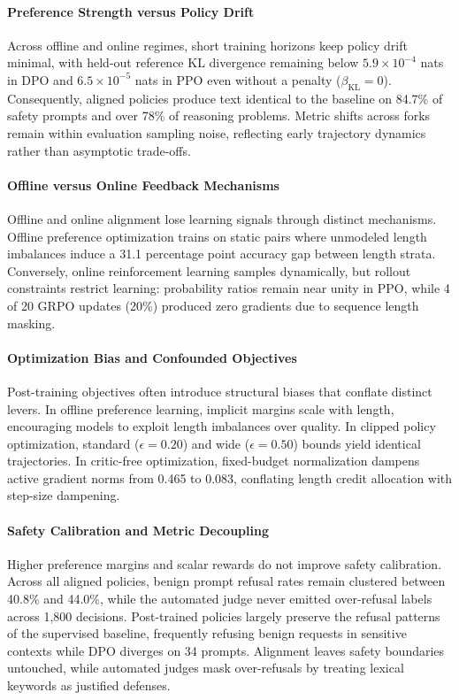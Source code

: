 \documentclass{article}
\begin{document}
\paragraph{Preference Strength versus Policy Drift}
Across offline and online regimes, short training horizons keep policy drift minimal, with held-out reference KL divergence remaining below $5.9 \times 10^{-4}$ nats in DPO and $6.5 \times 10^{-5}$ nats in PPO even without a penalty ($\beta_{\text{KL}}=0$). Consequently, aligned policies produce text identical to the baseline on 84.7\% of safety prompts and over 78\% of reasoning problems. Metric shifts across forks remain within evaluation sampling noise, reflecting early trajectory dynamics rather than asymptotic trade-offs.

\paragraph{Offline versus Online Feedback Mechanisms}
Offline and online alignment lose learning signals through distinct mechanisms. Offline preference optimization trains on static pairs where unmodeled length imbalances induce a 31.1 percentage point accuracy gap between length strata. Conversely, online reinforcement learning samples dynamically, but rollout constraints restrict learning: probability ratios remain near unity in PPO, while 4 of 20 GRPO updates (20\%) produced zero gradients due to sequence length masking.

\paragraph{Optimization Bias and Confounded Objectives}
Post-training objectives often introduce structural biases that conflate distinct levers. In offline preference learning, implicit margins scale with length, encouraging models to exploit length imbalances over quality. In clipped policy optimization, standard ($\epsilon=0.20$) and wide ($\epsilon=0.50$) bounds yield identical trajectories. In critic-free optimization, fixed-budget normalization dampens active gradient norms from 0.465 to 0.083, conflating length credit allocation with step-size dampening.

\paragraph{Safety Calibration and Metric Decoupling}
Higher preference margins and scalar rewards do not improve safety calibration. Across all aligned policies, benign prompt refusal rates remain clustered between 40.8\% and 44.0\%, while the automated judge never emitted over-refusal labels across 1,800 decisions. Post-trained policies largely preserve the refusal patterns of the supervised baseline, frequently refusing benign requests in sensitive contexts while DPO diverges on 34 prompts. Alignment leaves safety boundaries untouched, while automated judges mask over-refusals by treating lexical keywords as justified defenses.
\end{document}
